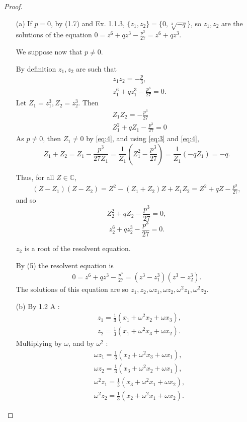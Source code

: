 \documentclass[11pt,a4paper]{article}
\begin{document}
\begin{proof}
\begin{enumerate}
\item[(a)] If $p=0$,  by (1.7) and Ex. 1.1.3, $\{z_1,z_2\} = \{0,\sqrt[3]{-q}\}$, so $z_1,z_2$ are the solutions of  the equation $ 0 = z^6+qz^3-\frac{p^3}{27} = z^6+qz^3$.

We suppose now that $p\neq 0$.

By definition $z_1, z_2$ are such that
\begin{align}
&z_1 z_2 = -\frac{p}{3}, \label{eq:1}\\
&z_1^6+qz_1^3-\frac{p^3}{27}=0.\label{eq:2}
\end{align}
Let $Z_1=z_1^3,Z_2=z_2^3$. Then
\begin{align}
&Z_1 Z_2 = -\frac{p^3}{27}\label{eq:3}\\
&Z_1^2+qZ_1-\frac{p^3}{27}=0\label{eq:4}
\end{align}
As $p\neq 0$, then $Z_1\neq 0$ by \eqref{eq:4}, and using \eqref{eq:3} and \eqref{eq:4},
$$Z_1+Z_2 = Z_1 -\frac{p^3}{27Z_1} = \frac{1}{Z_1}\left(Z_1^2 -\frac{p^3}{27}\right) = \frac{1}{Z_1}(-q Z_1) = -q.$$

Thus, for all $Z \in \mathbb{C}$,
\begin{align}
(Z-Z_1)(Z-Z_2)=Z^2-(Z_1+Z_2)Z+Z_1Z_2 = Z^2+qZ-\frac{p^3}{27}, \label{eq:5}
\end{align}
and so 
$$Z_2^2+qZ_2-\frac{p^3}{27}=0,$$
$$z_2^6+qz_2^3-\frac{p^3}{27} = 0.$$

$z_2$ is a root of the resolvent equation.

By (5) the resolvent equation is
\begin{align}
0 = z^6+qz^3-\frac{p^3}{27} = (z^3-z_1^3)(z^3-z_2^3).
\end{align}
The solutions of this equation are so $z_1,z_2,\omega z_1,\omega z_2,\omega^2 z_1,\omega^2 z_2$.


\item[(b)] By 1.2  A :
\begin{align*}
&z_1 = \frac{1}{3}(x_1+\omega^2 x_2+\omega x_3),\\
&z_2 = \frac{1}{3}(x_1+\omega^2  x_3+\omega x_2).
\end{align*}
Multiplying by $\omega$, and by $\omega^2$ : 
\begin{align*}
&\omega z_1 = \frac{1}{3}(x_2+\omega^2 x_3+\omega x_1),\\
&\omega z_2 = \frac{1}{3}(x_3+\omega^2 x_2+\omega x_1),\\
&\omega^2 z_1 = \frac{1}{3}(x_3+\omega^2 x_1+\omega x_2),\\
&\omega^2 z_2 = \frac{1}{3}(x_2+\omega^2 x_1+\omega x_2).
\end{align*}
\end{enumerate}
\end{proof}
\end{document}
